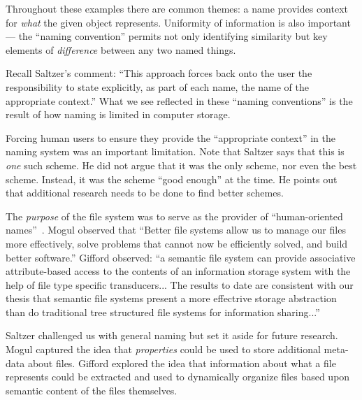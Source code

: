 
Throughout these examples there are common themes: a name provides context for
\emph{what} the given object represents. Uniformity of information is also
important --- the ``naming convention'' permits not only identifying similarity
but key elements of \emph{difference} between any two named things.



Recall Saltzer's comment: ``This approach forces back onto the user the
responsibility to state explicitly, as part of each name, the name of the
appropriate context.''  What we see reflected in these ``naming conventions'' is
the result of how naming is limited in computer storage.

Forcing human users to ensure they provide the ``appropriate context'' in the
naming system was an important limitation.  Note that Saltzer says that this is
\emph{one} such scheme.  He did not argue that it was the only scheme, nor even
the best scheme.  Instead, it was the scheme ``good enough'' at the time.  He
points out that additional research needs to be done to find better schemes.

The \emph{purpose} of the file system was to serve as the provider of
``human-oriented names''~\cite[Table III]{Saltzer1978}. Mogul observed that
``Better file systems allow us to manage our files more effectively, solve
problems that cannot now be efficiently solved, and build better software.''
Gifford observed: ``a semantic file system can provide associative
attribute-based access to the contents of an information storage system with the
help of file type specific transducers... The results to date are consistent
with our thesis that semantic file systems present a more effectrive storage
abstraction than do traditional tree structured file systems for information
sharing...''

Saltzer challenged us with general naming but set it aside for future research.
Mogul captured the idea that \emph{properties} could be used to store additional
meta-data about files.  Gifford explored the idea that information about what a
file represents could be extracted and used to dynamically organize files based
upon semantic content of the files themselves.

